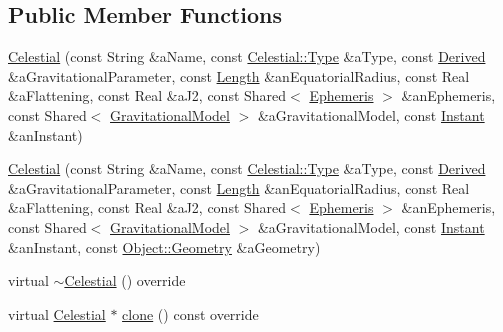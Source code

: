 \subsection*{Public Member Functions}
\begin{DoxyCompactItemize}
\item 
\hyperlink{classlibrary_1_1physics_1_1env_1_1obj_1_1_celestial_ae3710304fcb39c6cee0b0f1b9ea646f1}{Celestial} (const String \&a\+Name, const \hyperlink{classlibrary_1_1physics_1_1env_1_1obj_1_1_celestial_aab1f58aa727e639288d65f3d33c4f245}{Celestial\+::\+Type} \&a\+Type, const \hyperlink{classlibrary_1_1physics_1_1units_1_1_derived}{Derived} \&a\+Gravitational\+Parameter, const \hyperlink{classlibrary_1_1physics_1_1units_1_1_length}{Length} \&an\+Equatorial\+Radius, const Real \&a\+Flattening, const Real \&a\+J2, const Shared$<$ \hyperlink{classlibrary_1_1physics_1_1env_1_1_ephemeris}{Ephemeris} $>$ \&an\+Ephemeris, const Shared$<$ \hyperlink{namespacelibrary_1_1physics_1_1env_1_1obj_ade509c84a4970a3420c03c058ada152a}{Gravitational\+Model} $>$ \&a\+Gravitational\+Model, const \hyperlink{classlibrary_1_1physics_1_1time_1_1_instant}{Instant} \&an\+Instant)
\item 
\hyperlink{classlibrary_1_1physics_1_1env_1_1obj_1_1_celestial_a7c2263420e3ebdb99523a87716f7575a}{Celestial} (const String \&a\+Name, const \hyperlink{classlibrary_1_1physics_1_1env_1_1obj_1_1_celestial_aab1f58aa727e639288d65f3d33c4f245}{Celestial\+::\+Type} \&a\+Type, const \hyperlink{classlibrary_1_1physics_1_1units_1_1_derived}{Derived} \&a\+Gravitational\+Parameter, const \hyperlink{classlibrary_1_1physics_1_1units_1_1_length}{Length} \&an\+Equatorial\+Radius, const Real \&a\+Flattening, const Real \&a\+J2, const Shared$<$ \hyperlink{classlibrary_1_1physics_1_1env_1_1_ephemeris}{Ephemeris} $>$ \&an\+Ephemeris, const Shared$<$ \hyperlink{namespacelibrary_1_1physics_1_1env_1_1obj_ade509c84a4970a3420c03c058ada152a}{Gravitational\+Model} $>$ \&a\+Gravitational\+Model, const \hyperlink{classlibrary_1_1physics_1_1time_1_1_instant}{Instant} \&an\+Instant, const \hyperlink{classlibrary_1_1physics_1_1env_1_1_object_abdf50733c7ad97327fb64edca5670f13}{Object\+::\+Geometry} \&a\+Geometry)
\item 
virtual \hyperlink{classlibrary_1_1physics_1_1env_1_1obj_1_1_celestial_a508a59c34ac23a582f2fed6003c4c907}{$\sim$\+Celestial} () override
\item 
virtual \hyperlink{classlibrary_1_1physics_1_1env_1_1obj_1_1_celestial}{Celestial} $\ast$ \hyperlink{classlibrary_1_1physics_1_1env_1_1obj_1_1_celestial_aaf8aa41a0ff9336eba62c07e3c27f82d}{clone} () const override

\end{DoxyCompactItemize}
